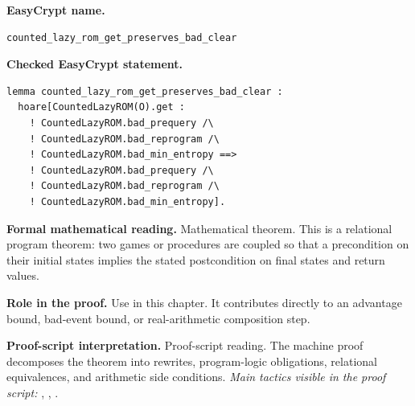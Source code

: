 \begin{formaltheorem}
\noindent\textbf{EasyCrypt name.}
\begin{lstlisting}[language=EasyCrypt,basicstyle=\ttfamily\scriptsize]
counted_lazy_rom_get_preserves_bad_clear
\end{lstlisting}
\noindent\textbf{Checked EasyCrypt statement.}
\begin{lstlisting}[language=EasyCrypt,basicstyle=\ttfamily\scriptsize]
lemma counted_lazy_rom_get_preserves_bad_clear :
  hoare[CountedLazyROM(O).get :
    ! CountedLazyROM.bad_prequery /\
    ! CountedLazyROM.bad_reprogram /\
    ! CountedLazyROM.bad_min_entropy ==>
    ! CountedLazyROM.bad_prequery /\
    ! CountedLazyROM.bad_reprogram /\
    ! CountedLazyROM.bad_min_entropy].
\end{lstlisting}
\noindent\textbf{Formal mathematical reading.}
Mathematical theorem. This is a relational program theorem: two games or procedures are coupled so that a precondition on their initial states implies the stated postcondition on final states and return values.

\noindent\textbf{Role in the proof.}
Use in this chapter. It contributes directly to an advantage bound, bad-event bound, or real-arithmetic composition step.

\noindent\textbf{Proof-script interpretation.}
Proof-script reading. The machine proof decomposes the theorem into rewrites, program-logic obligations, relational equivalences, and arithmetic side conditions.
\emph{Main tactics visible in the proof script:} \ec{proc}, \ec{wp}, \ec{call}.

\end{formaltheorem}

